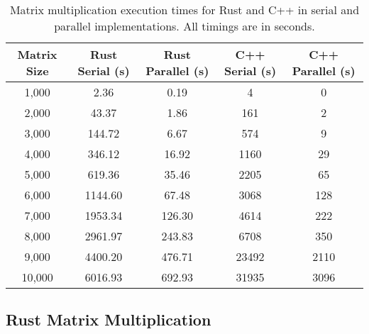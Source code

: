 \documentclass[12pt]{article}
\begin{document}
\begin{table}[H]
    \centering
    \begin{tabular}{|c|c|c|c|c|}
        \hline
        \textbf{Matrix Size} & \textbf{Rust Serial (s)} & \textbf{Rust Parallel (s)} & \textbf{C++ Serial (s)} & \textbf{C++ Parallel (s)} \\
        \hline
        1,000                & 2.36                     & 0.19                       & 4                       & 0                         \\
        2,000                & 43.37                    & 1.86                       & 161                     & 2                         \\
        3,000                & 144.72                   & 6.67                       & 574                     & 9                         \\
        4,000                & 346.12                   & 16.92                      & 1160                    & 29                        \\
        5,000                & 619.36                   & 35.46                      & 2205                    & 65                        \\
        6,000                & 1144.60                  & 67.48                      & 3068                    & 128                       \\
        7,000                & 1953.34                  & 126.30                     & 4614                    & 222                       \\
        8,000                & 2961.97                  & 243.83                     & 6708                    & 350                       \\
        9,000                & 4400.20                  & 476.71                     & 23492                   & 2110                      \\
        10,000               & 6016.93                  & 692.93                     & 31935                   & 3096                      \\
        \hline
    \end{tabular}
    \caption{Matrix multiplication execution times for Rust and C++ in serial and parallel implementations.
        All timings are in seconds.}
    \label{tab:matrix-timings}
\end{table}


\subsection*{Rust Matrix Multiplication}
\end{document}
